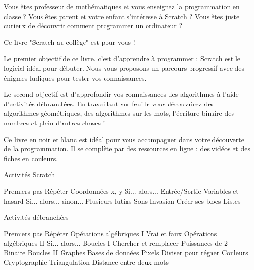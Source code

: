 
Vous êtes professeur de mathématiques et vous enseignez la programmation en classe ? Vous êtes parent et votre enfant s'intéresse à Scratch ? Vous êtes juste curieux de découvrir comment programmer un ordinateur ?

Ce livre "Scratch au collège" est pour vous !

Le premier objectif de ce livre, c'est d'apprendre à programmer : Scratch est le logiciel idéal pour débuter. Nous vous proposons un parcours progressif avec des énigmes ludiques pour tester vos connaissances.

Le second objectif est d'approfondir vos connaissances des algorithmes à l'aide d'activités débranchées. En travaillant sur feuille vous découvrirez des algorithmes géométriques, des algorithmes sur les mots, l'écriture binaire des nombres et plein d'autres choses !

Ce livre en noir et blanc est idéal pour vous accompagner dans votre découverte de la programmation. Il se complète par des ressources en ligne : des vidéos et des fiches en couleurs.



Activités Scratch

    Premiers pas
    Répéter
    Coordonnées x, y
    Si... alors...
    Entrée/Sortie
    Variables et hasard
    Si... alors... sinon...
    Plusieurs lutins
    Sons
    Invasion
    Créer ses blocs
    Listes


Activités débranchées

    Premiers pas
    Répéter
    Opérations algébriques I
    Vrai et faux
    Opérations algébriques II
    Si... alors...
    Boucles I
    Chercher et remplacer
    Puissances de 2
    Binaire
    Boucles II
    Graphes
    Bases de données
    Pixels
    Diviser pour régner
    Couleurs
    Cryptographie
    Triangulation
    Distance entre deux mots

